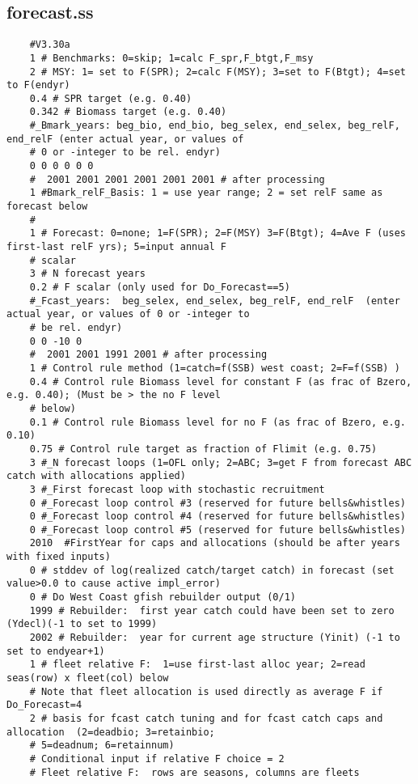 \begin{landscape}
\subsection{forecast.ss}
\scriptsize{
\begin{verbatim}
	#V3.30a
	1 # Benchmarks: 0=skip; 1=calc F_spr,F_btgt,F_msy 
	2 # MSY: 1= set to F(SPR); 2=calc F(MSY); 3=set to F(Btgt); 4=set to F(endyr) 
	0.4 # SPR target (e.g. 0.40)
	0.342 # Biomass target (e.g. 0.40)
	#_Bmark_years: beg_bio, end_bio, beg_selex, end_selex, beg_relF, end_relF (enter actual year, or values of
	# 0 or -integer to be rel. endyr)
	0 0 0 0 0 0
	#  2001 2001 2001 2001 2001 2001 # after processing 
	1 #Bmark_relF_Basis: 1 = use year range; 2 = set relF same as forecast below
	#
	1 # Forecast: 0=none; 1=F(SPR); 2=F(MSY) 3=F(Btgt); 4=Ave F (uses first-last relF yrs); 5=input annual F
	# scalar
	3 # N forecast years 
	0.2 # F scalar (only used for Do_Forecast==5)
	#_Fcast_years:  beg_selex, end_selex, beg_relF, end_relF  (enter actual year, or values of 0 or -integer to
	# be rel. endyr)
	0 0 -10 0
	#  2001 2001 1991 2001 # after processing 
	1 # Control rule method (1=catch=f(SSB) west coast; 2=F=f(SSB) ) 
	0.4 # Control rule Biomass level for constant F (as frac of Bzero, e.g. 0.40); (Must be > the no F level
	# below) 
	0.1 # Control rule Biomass level for no F (as frac of Bzero, e.g. 0.10) 
	0.75 # Control rule target as fraction of Flimit (e.g. 0.75) 
	3 #_N forecast loops (1=OFL only; 2=ABC; 3=get F from forecast ABC catch with allocations applied)
	3 #_First forecast loop with stochastic recruitment
	0 #_Forecast loop control #3 (reserved for future bells&whistles) 
	0 #_Forecast loop control #4 (reserved for future bells&whistles) 
	0 #_Forecast loop control #5 (reserved for future bells&whistles) 
	2010  #FirstYear for caps and allocations (should be after years with fixed inputs) 
	0 # stddev of log(realized catch/target catch) in forecast (set value>0.0 to cause active impl_error)
	0 # Do West Coast gfish rebuilder output (0/1) 
	1999 # Rebuilder:  first year catch could have been set to zero (Ydecl)(-1 to set to 1999)
	2002 # Rebuilder:  year for current age structure (Yinit) (-1 to set to endyear+1)
	1 # fleet relative F:  1=use first-last alloc year; 2=read seas(row) x fleet(col) below
	# Note that fleet allocation is used directly as average F if Do_Forecast=4 
	2 # basis for fcast catch tuning and for fcast catch caps and allocation  (2=deadbio; 3=retainbio; 
	# 5=deadnum; 6=retainnum)
	# Conditional input if relative F choice = 2
	# Fleet relative F:  rows are seasons, columns are fleets

\end{verbatim}}
\end{landscape}
